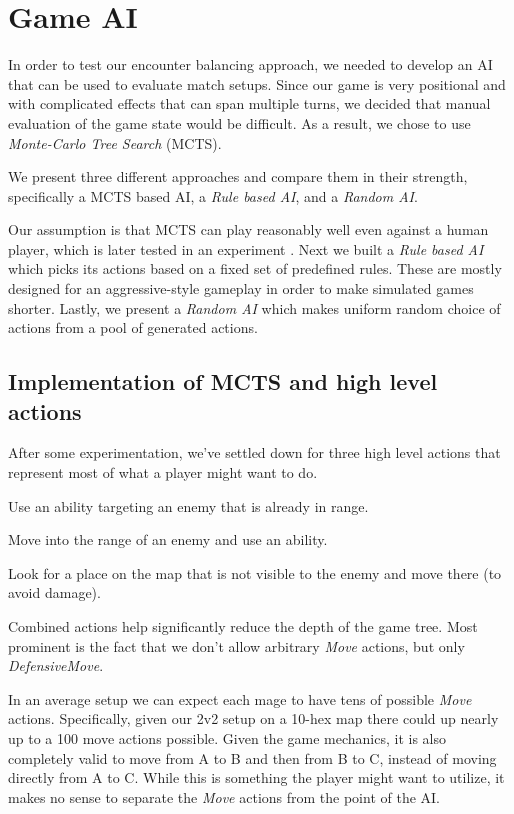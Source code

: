 \chapter{Game AI}

In order to test our encounter balancing approach, we needed to develop an
AI that can be used to evaluate match setups. Since our game is very
positional and with complicated effects that can span multiple turns, we
decided that manual evaluation of the game state would be difficult. As a
result, we chose to use \emph{Monte-Carlo Tree Search} (MCTS).

We present three different approaches and compare them in their strength,
specifically a MCTS based AI, a \emph{Rule based AI}, and a \emph{Random
AI}.

Our assumption  is that MCTS can play reasonably well
even against a human player, which is later tested in an experiment
. Next we built a \emph{Rule based AI} which picks
its actions based on a fixed set of predefined rules. These are mostly
designed for an aggressive-style gameplay in order to make simulated games
shorter. Lastly, we present a \emph{Random AI} which makes uniform random
choice of actions from a pool of generated actions.

\section{Implementation of MCTS and high level actions}

After some experimentation, we've settled down for three high level actions
that represent most of what a player might want to do.

\begin{description}[align=right,labelwidth=3cm]
\item [AbilityUse] Use an ability targeting an enemy that is already in range.
\item [AttackMove] Move into the range of an enemy and use an ability.
\item [DefensiveMove] Look for a place on the map that is not visible to the enemy and move there (to avoid damage).
\end{description}

Combined actions help significantly reduce the depth of the game tree. Most
prominent is the fact that we don't allow arbitrary \emph{Move} actions, but
only \emph{DefensiveMove}.

In an average setup we can expect each mage to have tens of possible
\emph{Move} actions. Specifically, given our 2v2 setup on a 10-hex map there
could up nearly up to a 100 move actions possible. Given the game mechanics, it
is also completely valid to move from A to B and then from B to C, instead of
moving directly from A to C. While this is something the player might want to
utilize, it makes no sense to separate the \emph{Move} actions from the point
of the AI\@.

